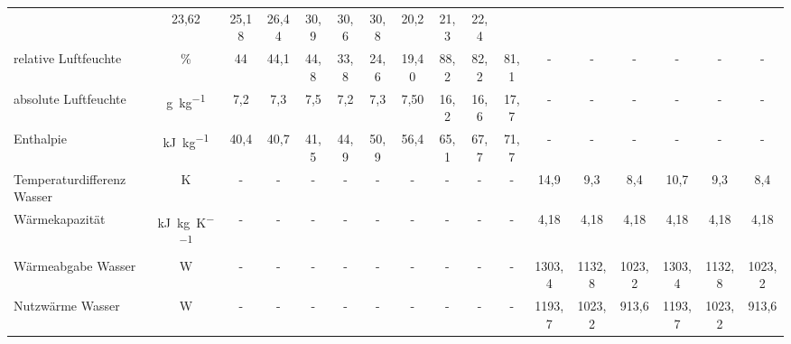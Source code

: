 \begin{landscape}
\begin{table}[h!]
{\begin{tabular}{l|c|c|c|c|c|c|c|c|c|c|c|c|c|c|c|c}
					&23,62 & 25,18 & 26,44 
					&\multicolumn{1}{c|}{30,9} & \multicolumn{1}{c|}{30,6} & \multicolumn{1}{c|}{30,8} 
					&\multicolumn{1}{c|}{20,2} & \multicolumn{1}{c|}{21,3} & \multicolumn{1}{c}{22,4} \\
					relative Luftfeuchte & \%    & \multicolumn{1}{c|}{44} & \multicolumn{1}{c|}{44,1} &
					\multicolumn{1}{c|}{44,8} 
					& 33,8  & 24,6  & 19,40 
					& 88,2  & 82,2  & 81,1  & -     & -     & -     & -     & -     & - \\
					absolute Luftfeuchte & \si{\gram \per \kg}  
					& \multicolumn{1}{c|}{7,2} & \multicolumn{1}{c|}{7,3} & \multicolumn{1}{c|}{7,5} 
					& 7,2   & 7,3   & 7,50  
					& 16,2  & 16,6  & 17,7 & -     & -     & -     & -     & -     & - \\
					Enthalpie & \si{\kilo \joule \per \kg} & \multicolumn{1}{c|}{40,4} & \multicolumn{1}{c|}{40,7} & \multicolumn{1}{c|}{41,5} 
					& 44,9  & 50,9  & 56,4  
					& 65,1  & 67,7  & 71,7  & -     & -     & -     & -     & -     & - \\
					\hline
					Temperaturdifferenz  Wasser & K     & -     & -     & -     & \multicolumn{1}{c|}{-} & \multicolumn{1}{c|}{-} & \multicolumn{1}{c|}{-} & \multicolumn{1}{c|}{-} & \multicolumn{1}{c|}{-} & \multicolumn{1}{c|}{-} 
					& \multicolumn{1}{c|}{14,9} & \multicolumn{1}{c|}{9,3} & \multicolumn{1}{c|}{8,4}
					& \multicolumn{1}{c|}{10,7} & 9,3   & 8,4 \\
					Wärmekapazität & \si{\kilo \joule \per \kg \per \kelvin} & -     & -     & -     & \multicolumn{1}{c|}{-} & \multicolumn{1}{c|}{-} & \multicolumn{1}{c|}{-} & \multicolumn{1}{c|}{-} & \multicolumn{1}{c|}{-} & \multicolumn{1}{c|}{-}
					& \multicolumn{1}{c|}{4,18} & \multicolumn{1}{c|}{4,18} & \multicolumn{1}{c|}{4,18} & \multicolumn{1}{c|}{4,18} & 4,18  & 4,18 \\
					Wärmeabgabe Wasser & W     & -     & -     & -     & \multicolumn{1}{c|}{-} & \multicolumn{1}{c|}{-} & \multicolumn{1}{c|}{-} & \multicolumn{1}{c|}{-} & \multicolumn{1}{c|}{-} & \multicolumn{1}{c|}{-} & \multicolumn{1}{c|}{1303,4} & \multicolumn{1}{c|}{1132,8} & \multicolumn{1}{c|}{1023,2} & \multicolumn{1}{c|}{1303,4} & 1132,8 & 1023,2 \\
					Nutzwärme Wasser & W     & -     & -     & -     & \multicolumn{1}{c|}{-} & \multicolumn{1}{c|}{-} & \multicolumn{1}{c|}{-} & \multicolumn{1}{c|}{-} & \multicolumn{1}{c|}{-} & \multicolumn{1}{c|}{-} & \multicolumn{1}{c|}{1193,7} & \multicolumn{1}{c|}{1023,2} & \multicolumn{1}{c|}{913,6} & \multicolumn{1}{c|}{1193,7} & 1023,2 & 913,6 \\

\end{tabular}}
\end{table}
\end{landscape}
